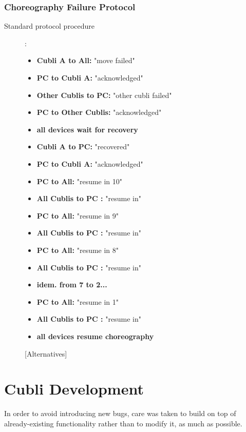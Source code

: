 \subsubsection{Choreography Failure Protocol}

\begin{description}
\item[Standard protocol procedure]:

\begin{itemize}
\item[] \textbf{Cubli A      to All:} "move failed"
\item[] \textbf{PC       to Cubli A:} "acknowledged"
\item[] \textbf{Other Cublis  to PC:} "other cubli failed"
\item[] \textbf{PC  to Other Cublis:} "acknowledged"
\item[] \textbf{all devices wait for recovery}
\item[] \textbf{Cubli A       to PC:} "recovered"
\item[] \textbf{PC       to Cubli A:} "acknowledged"
\item[] \textbf{PC           to All:} "resume in 10"
\item[] \textbf{All Cublis   to PC :} "resume in"
\item[] \textbf{PC           to All:} "resume in  9"
\item[] \textbf{All Cublis   to PC :} "resume in"
\item[] \textbf{PC           to All:} "resume in  8"
\item[] \textbf{All Cublis   to PC :} "resume in"
\item[] \textbf{idem. from 7 to 2...}
\item[] \textbf{PC           to All:} "resume in  1"
\item[] \textbf{All Cublis   to PC :} "resume in"
\item[] \textbf{all devices resume choreography}

\end{itemize}

[Alternatives]

\end{description}

\section{Cubli Development}

In order to avoid introducing new bugs, care was taken to build on top of already-existing functionality rather than to modify it, as much as possible.

